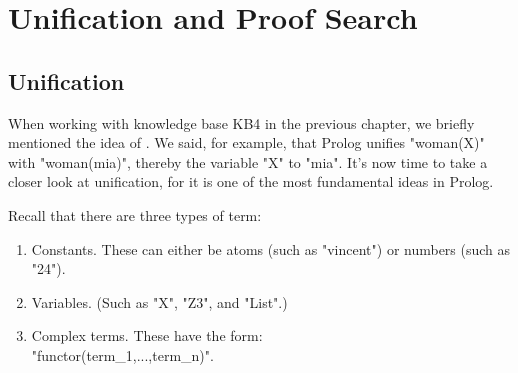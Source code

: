 

\chapter{Unification and Proof Search}\label{CHAPTER2}

\section{Unification}\label{SEC.L2.UNIFICATION}



When working with knowledge base KB4 in the previous chapter, we
briefly mentioned the idea of . We said, for
example, that Prolog unifies "woman(X)" with "woman(mia)", thereby
 the variable "X" to "mia". It's now time to take a
closer look at unification, for it is one of the most fundamental
ideas in Prolog.

Recall that there are three types of term:

\begin{enumerate}
\item{}Constants. These can either be atoms (such as "vincent") or numbers
(such as "24").
\item{}Variables. (Such as "X", "Z3", and "List".)
\item{}Complex terms. These have the form:\\ "functor(term\_1,...,term\_n)".
\end{enumerate}

